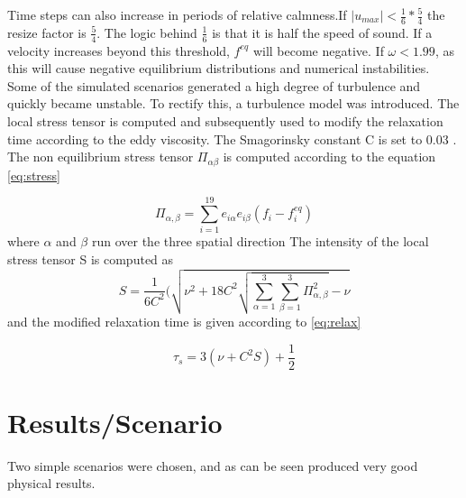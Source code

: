 \documentclass[10pt,a4paper,notitlepage]{article}
\begin{document}
Time steps can also increase in periods of relative calmness.If $|u_{max}|<\frac{1}{6}*\frac{5}{4}$ the resize factor is $\frac{5}{4}$. The logic behind $\frac{1}{6}$ is that it is half the speed of sound. If a velocity increases beyond this threshold, $f^{eq}$ will become negative.
If $\omega<1.99$, as this will cause negative equilibrium distributions and numerical instabilities. Some of the simulated scenarios generated a high degree of turbulence and quickly became unstable. To rectify this, a turbulence model was introduced. The local stress tensor is computed and subsequently used to modify the relaxation time according to the eddy viscosity. The Smagorinsky constant C is set to 0.03 \cite{thurey2007physically}. The non equilibrium stress tensor $\Pi_{\alpha\beta}$ is computed according to the equation \eqref{eq:stress}

\begin{equation} \label{eq:stress}
\Pi_{\alpha,\beta}=\sum^{19}_{i=1}e_{i\alpha}e_{i\beta}(f_{i}-f_{i}^{eq})
\end{equation}
where $\alpha$ and $\beta$ run over the three spatial direction
 The intensity of the local stress tensor S is computed as 
\begin{equation} \label{eq:intensity}
S=\frac{1}{6C^{2}}(\sqrt{\nu^{2}+18C^{2}\sqrt{\sum^{3}_{\alpha=1}\sum^{3}_{\beta=1}\Pi_{\alpha,\beta}^{2}}-\nu}
\end{equation}
and the modified relaxation time is given according to \eqref{eq:relax}

\begin{equation} \label{eq:relax}
\tau_s=3(\nu+C^{2}S)+\frac{1}{2}
\end{equation}
\section{Results/Scenario}
Two simple scenarios were chosen, and as can be seen produced very good physical results.
\end{document}
